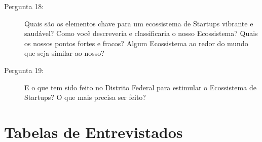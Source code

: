 \begin{apendicesenv}
\begin{description}
  
  \item [Pergunta 18:] Quais são os elementos chave para um ecossistema de Startups vibrante e saudável? Como você descreveria e classificaria o nosso Ecossistema? Quais os nossos pontos fortes e fracos? Algum Ecossistema ao redor do mundo que seja similar ao nosso?

  \item [Pergunta 19:] E o que tem sido feito no Distrito Federal para estimular o Ecossistema de Startups? O que mais precisa ser feito?
\end{description}

\chapter{Tabelas de Entrevistados}
\label{apendices:tabelas_de_entrevistados}


\end{apendicesenv}
